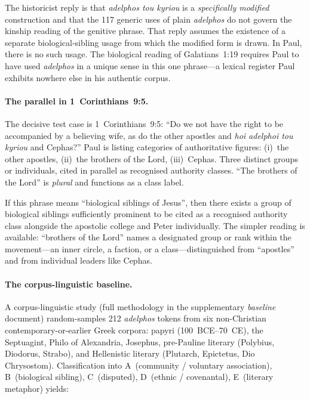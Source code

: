\documentclass[12pt,oneside]{article}
\newcommand{\grk}[1]{\textit{#1}}
\begin{document}
The historicist reply is that \grk{adelphos tou kyriou} is a
\textit{specifically modified} construction and that the 117
generic uses of plain \grk{adelphos} do not govern the kinship
reading of the genitive phrase.  That reply assumes the existence
of a separate biological-sibling usage from which the modified
form is drawn.  In Paul, there is no such usage.  The biological
reading of Galatians~1:19 requires Paul to have used
\grk{adelphos} in a unique sense in this one phrase---a lexical
register Paul exhibits nowhere else in his authentic corpus.

\paragraph{The parallel in 1~Corinthians~9:5.}
The decisive test case is 1~Corinthians~9:5: \enquote{Do we not
have the right to be accompanied by a believing wife, as do the
other apostles and \grk{hoi adelphoi tou kyriou} and Cephas?}
Paul is listing categories of authoritative figures:
(i)~the other apostles, (ii)~the brothers of the Lord,
(iii)~Cephas.  Three distinct groups or individuals, cited in
parallel as recognised authority classes.  \enquote{The brothers
of the Lord} is \textit{plural} and functions as a class label.

If this phrase means \enquote{biological siblings of Jesus}, then
there exists a group of biological siblings sufficiently prominent
to be cited as a recognised authority class alongside the
apostolic college and Peter individually.  The simpler reading is
available: \enquote{brothers of the Lord} names a designated group
or rank within the movement---an inner circle, a faction, or a
class---distinguished from \enquote{apostles} and from individual
leaders like Cephas.

\paragraph{The corpus-linguistic baseline.}
A corpus-linguistic study (full methodology in the supplementary
\textit{baseline} document) random-samples 212 \grk{adelphos}
tokens from six non-Christian contemporary-or-earlier Greek
corpora: papyri (100~BCE--70~CE), the Septuagint, Philo of
Alexandria, Josephus, pre-Pauline literary (Polybius, Diodorus,
Strabo), and Hellenistic literary (Plutarch, Epictetus, Dio
Chrysostom).  Classification into A~(community / voluntary
association), B~(biological sibling), C~(disputed), D~(ethnic /
covenantal), E~(literary metaphor) yields:
\end{document}
